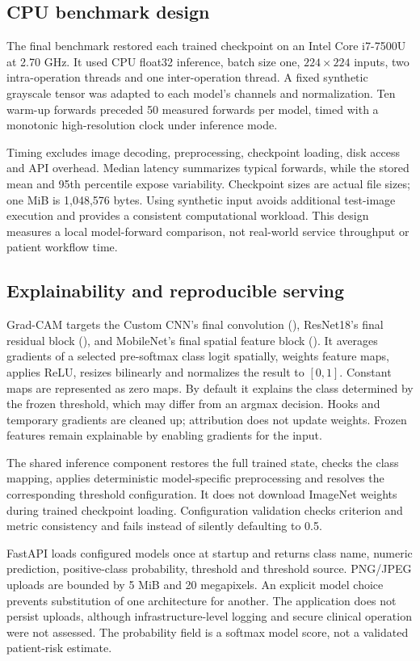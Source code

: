 \documentclass[11pt,a4paper]{article}
\newcommand{\code}[1]{\texttt{\detokenize{#1}}}
\begin{document}
\subsection{CPU benchmark design}
The final benchmark restored each trained checkpoint on an Intel Core i7-7500U at 2.70 GHz. It used CPU float32 inference, batch size one, $224\times224$ inputs, two intra-operation threads and one inter-operation thread. A fixed synthetic grayscale tensor was adapted to each model's channels and normalization. Ten warm-up forwards preceded 50 measured forwards per model, timed with a monotonic high-resolution clock under inference mode.

Timing excludes image decoding, preprocessing, checkpoint loading, disk access and API overhead. Median latency summarizes typical forwards, while the stored mean and 95th percentile expose variability. Checkpoint sizes are actual file sizes; one MiB is 1,048,576 bytes. Using synthetic input avoids additional test-image execution and provides a consistent computational workload. This design measures a local model-forward comparison, not real-world service throughput or patient workflow time.

\subsection{Explainability and reproducible serving}
Grad-CAM targets the Custom CNN's final convolution (\code{features.12}), ResNet18's final residual block (\code{layer4.1}), and MobileNet's final spatial feature block (\code{features.12}). It averages gradients of a selected pre-softmax class logit spatially, weights feature maps, applies ReLU, resizes bilinearly and normalizes the result to $[0,1]$. Constant maps are represented as zero maps. By default it explains the class determined by the frozen threshold, which may differ from an argmax decision. Hooks and temporary gradients are cleaned up; attribution does not update weights. Frozen features remain explainable by enabling gradients for the input.

The shared inference component restores the full trained state, checks the class mapping, applies deterministic model-specific preprocessing and resolves the corresponding threshold configuration. It does not download ImageNet weights during trained checkpoint loading. Configuration validation checks criterion and metric consistency and fails instead of silently defaulting to 0.5.

FastAPI loads configured models once at startup and returns class name, numeric prediction, positive-class probability, threshold and threshold source. PNG/JPEG uploads are bounded by 5 MiB and 20 megapixels. An explicit model choice prevents substitution of one architecture for another. The application does not persist uploads, although infrastructure-level logging and secure clinical operation were not assessed. The probability field is a softmax model score, not a validated patient-risk estimate.
\end{document}
